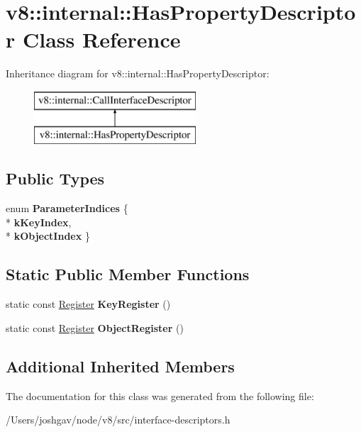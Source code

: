 \hypertarget{classv8_1_1internal_1_1_has_property_descriptor}{}\section{v8\+:\+:internal\+:\+:Has\+Property\+Descriptor Class Reference}
\label{classv8_1_1internal_1_1_has_property_descriptor}
Inheritance diagram for v8\+:\+:internal\+:\+:Has\+Property\+Descriptor\+:\begin{figure}[H]
\begin{center}
\leavevmode
\includegraphics[height=2.000000cm]{classv8_1_1internal_1_1_has_property_descriptor}
\end{center}
\end{figure}
\subsection*{Public Types}
\begin{DoxyCompactItemize}
\item 
enum {\bfseries Parameter\+Indices} \{ \\*
{\bfseries k\+Key\+Index}, 
\\*
{\bfseries k\+Object\+Index}
 \}\hypertarget{classv8_1_1internal_1_1_has_property_descriptor_a9abbced3b889e79bd5e24903677b0c72}{}\label{classv8_1_1internal_1_1_has_property_descriptor_a9abbced3b889e79bd5e24903677b0c72}

\end{DoxyCompactItemize}
\subsection*{Static Public Member Functions}
\begin{DoxyCompactItemize}
\item 
static const \hyperlink{structv8_1_1internal_1_1_register}{Register} {\bfseries Key\+Register} ()\hypertarget{classv8_1_1internal_1_1_has_property_descriptor_a1b2e2a060a529e678ed2e273db2bde34}{}\label{classv8_1_1internal_1_1_has_property_descriptor_a1b2e2a060a529e678ed2e273db2bde34}

\item 
static const \hyperlink{structv8_1_1internal_1_1_register}{Register} {\bfseries Object\+Register} ()\hypertarget{classv8_1_1internal_1_1_has_property_descriptor_a5a8ccfd61d8258138813d8c08d49d743}{}\label{classv8_1_1internal_1_1_has_property_descriptor_a5a8ccfd61d8258138813d8c08d49d743}

\end{DoxyCompactItemize}
\subsection*{Additional Inherited Members}


The documentation for this class was generated from the following file\+:\begin{DoxyCompactItemize}
\item 
/\+Users/joshgav/node/v8/src/interface-\/descriptors.\+h\end{DoxyCompactItemize}

